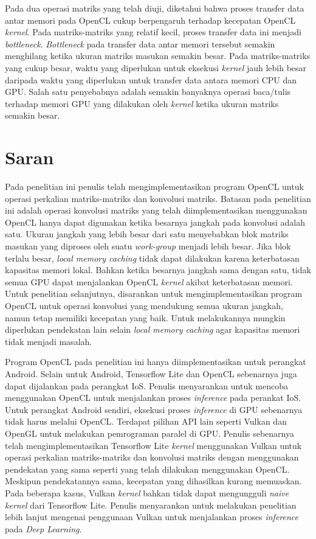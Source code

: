 Pada dua operasi matriks yang telah diuji, diketahui bahwa proses transfer data antar memori pada OpenCL cukup berpengaruh terhadap kecepatan OpenCL \textit{kernel}. Pada matriks-matriks yang relatif kecil, proses transfer data ini menjadi \textit{bottleneck}. \textit{Bottleneck} pada transfer data antar memori tersebut semakin menghilang ketika ukuran matriks masukan semakin besar. Pada matriks-matriks yang cukup besar, waktu yang diperlukan untuk eksekusi \textit{kernel} jauh lebih besar daripada waktu yang diperlukan untuk transfer data antara memori CPU dan GPU. Salah satu penyebabnya adalah semakin banyaknya operasi baca/tulis terhadap memori GPU yang dilakukan oleh \textit{kernel} ketika ukuran matriks semakin besar. 

\section{Saran}
Pada penelitian ini penulis telah mengimplementasikan program OpenCL untuk operasi perkalian matriks-matriks dan konvolusi matriks. Batasan pada penelitian ini adalah operasi konvolusi matriks yang telah diimplementasikan menggunakan OpenCL hanya dapat digunakan ketika besarnya jangkah pada konvolusi adalah satu. Ukuran jangkah yang lebih besar dari satu menyebabkan blok matriks masukan yang diproses oleh suatu \textit{work-group} menjadi lebih besar. Jika blok terlalu besar, \textit{local memory caching} tidak dapat dilakukan karena keterbatasan kapasitas memori lokal. Bahkan ketika besarnya jangkah sama dengan satu, tidak semua GPU dapat menjalankan OpenCL \textit{kernel} akibat keterbatasan memori. Untuk penelitian selanjutnya, disarankan untuk mengimplementasikan program OpenCL untuk operasi konvolusi yang mendukung semua ukuran jangkah, namun tetap memiliki kecepatan yang baik. Untuk melakukannya mungkin diperlukan pendekatan lain selain \textit{local memory caching} agar kapasitas memori tidak menjadi masalah.

Program OpenCL pada penelitian ini hanya diimplementasikan untuk perangkat Android. Selain untuk Android, Tensorflow Lite dan OpenCL sebenarnya juga dapat dijalankan pada perangkat IoS. Penulis menyarankan untuk mencoba menggunakan OpenCL untuk menjalankan proses \textit{inference} pada perankat IoS. Untuk perangkat Android sendiri, eksekusi proses \textit{inference}  di GPU sebenarnya tidak harus melalui OpenCL. Terdapat pilihan API lain seperti Vulkan \cite{vulkan} dan OpenGL \cite{opengl} untuk melakukan pemrograman paralel di GPU. Penulis sebenarnya telah mengimplementasikan Tensorflow Lite \textit{kernel} menggunakan Vulkan untuk operasi perkalian matriks-matriks dan konvolusi matriks dengan menggunakan pendekatan yang sama seperti yang telah dilakukan menggunakan OpenCL. Meskipun pendekatannya sama, kecepatan yang dihasilkan kurang memuaskan. Pada beberapa kasus, Vulkan \textit{kernel} bahkan tidak dapat mengungguli \textit{naive kernel} dari Tensorflow Lite. Penulis menyarankan untuk melakukan penelitian lebih lanjut mengenai penggunaan Vulkan untuk menjalankan proses \textit{inference} pada \textit{Deep Learning}.